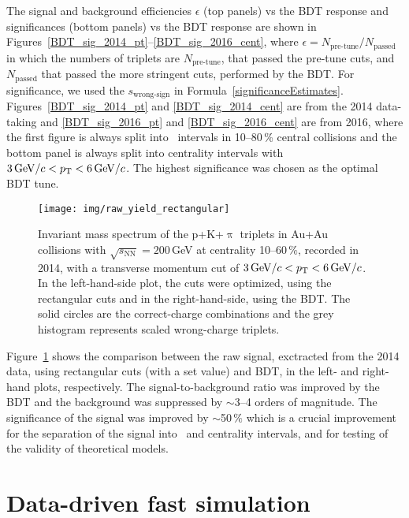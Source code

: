 The signal and background efficiencies $\epsilon$ (top panels) vs the BDT response and significances (bottom panels) vs the BDT response are shown in Figures~\ref{BDT_sig_2014_pt}--\ref{BDT_sig_2016_cent}, where $\epsilon = N_\text{pre-tune}/N_\text{passed}$ in which the numbers of triplets are $N_\text{pre-tune}$, that passed the pre-tune cuts, and $N_\text{passed}$ that passed the more stringent cuts, performed by the BDT\@. For significance, we used the $s_\text{wrong-sign}$ in Formula~\eqref{significanceEstimates}\@. Figures~\ref{BDT_sig_2014_pt} and \ref{BDT_sig_2014_cent} are from the 2014 data-taking and \ref{BDT_sig_2016_pt} and \ref{BDT_sig_2016_cent} are from 2016, where the first figure is always split into \pt\ intervals in 10--80\,\% central collisions and the bottom panel is always split into centrality intervals with $3\,\text{GeV}/c < {p_{\mathrm{T}}} < 6\,\text{GeV}/c$\@. The highest significance was chosen as the optimal BDT tune.

\begin{figure}[!htb]
\centering
\texttt{[image: img/raw\_yield\_rectangular]}
\caption[ Invariant mass spectrum of the p+K+$\uppi$ triplets.]{\label{fig:bdt_vs_rect} Invariant mass spectrum of the p+K+$\uppi$ triplets in Au+Au collisions with $\sqrt{s_\mathrm{NN}} = 200\,$GeV at centrality 10--60$\,\%$, recorded in 2014, with a transverse momentum cut of $3\,\text{GeV}/c < {p_{\mathrm{T}}} < 6\,\text{GeV}/c$\@. In the left-hand-side plot, the cuts were optimized, using the rectangular cuts and in the right-hand-side, using the BDT\@. The solid circles are the correct-charge combinations and the grey histogram represents scaled wrong-charge triplets.}

\end{figure}

Figure~\ref{fig:bdt_vs_rect} shows the comparison between the raw signal, exctracted from the 2014 data, using rectangular cuts (with a set value) and BDT, in the left- and right-hand plots, respectively. The signal-to-background ratio was improved by the BDT and the background was suppressed by $\sim$3--4 orders of magnitude. The significance of the signal was improved by $\sim$50$\,\%$ which is a crucial improvement for the separation of the signal into \pt\ and centrality intervals, and for testing of the validity of theoretical models.



\section{Data-driven fast simulation\label{fastsim}}

